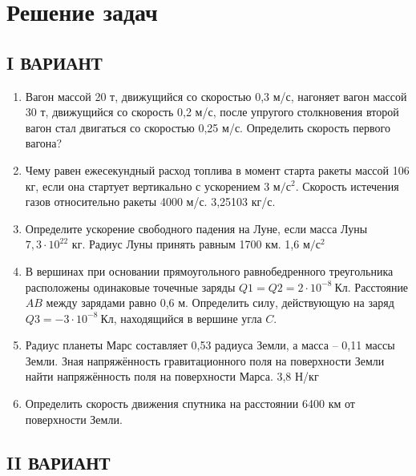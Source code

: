 \documentclass[a5paper, 10pt]{diss_4}
\renewcommand{\'}{\,'}
\begin{document}
\section{Решение задач}

\subsection{I ВАРИАНТ}

\begin{enumerate}

  \item Вагон  массой  20 т,  движущийся  со скоростью  0,3 м/с,  нагоняет  вагон  массой  30 т, движущийся со скорость 0,2 м/с, после упругого столкновения второй вагон стал двигаться  со скоростью 0,25 м/с. Определить скорость первого вагона?

  \item Чему равен ежесекундный расход топлива в момент старта ракеты массой 106 кг, если она стартует вертикально с ускорением 3 $м/с^2$. Скорость истечения газов относительно ракеты 4000 м/с. 3,25103 кг/с.

  \item Определите ускорение свободного падения на Луне, если масса Луны $7,3\cdot10^{22}$ кг. Радиус Луны принять равным 1700 км. 1,6 $м/с^2$

  \item В вершинах при основании прямоугольного равнобедренного треугольника расположены одинаковые точечные заряды $Q1=Q2=2\cdot10^{-8}\ Кл$. Расстояние $AB$ между зарядами равно 0,6 м. Определить силу, действующую на заряд $Q3=-3\cdot10^{-8}\ Кл$, находящийся в вершине угла $C$.

  \item Радиус планеты Марс составляет 0,53 радиуса Земли, а масса -- 0,11 массы Земли. Зная напряжённость гравитационного поля на поверхности Земли найти напряжённость поля на поверхности Марса. 3,8 Н/кг

  \item Определить скорость движения спутника на расстоянии 6400 км от поверхности Земли.

\end{enumerate}


\subsection{II ВАРИАНТ}
\end{document}
